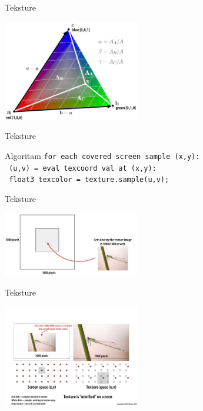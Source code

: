 \documentclass[9pt]{beamer}
\begin{document}
\begin{frame}{Teksture}
	\begin{center}
		\includegraphics[width=6cm]{./slike/slide_029.jpg}
	\end{center}
\end{frame}

\begin{frame}{Teksture}
	\begin{block}{Algoritam}
		\texttt{for each covered screen sample (x,y):}\\
		\texttt{\ (u,v) = eval texcoord val at (x,y):}\\
		\texttt{\ float3 texcolor = texture.sample(u,v);} \\
	\end{block}
\end{frame}

\begin{frame}{Teksture}
	\begin{center}
		\includegraphics[width=6cm]{./slike/slide_050.jpg}
	\end{center}
\end{frame}

\begin{frame}{Teksture}
	\begin{center}
		\includegraphics[width=6cm]{./slike/slide_051.jpg}
	\end{center}
\end{frame}
\end{document}
